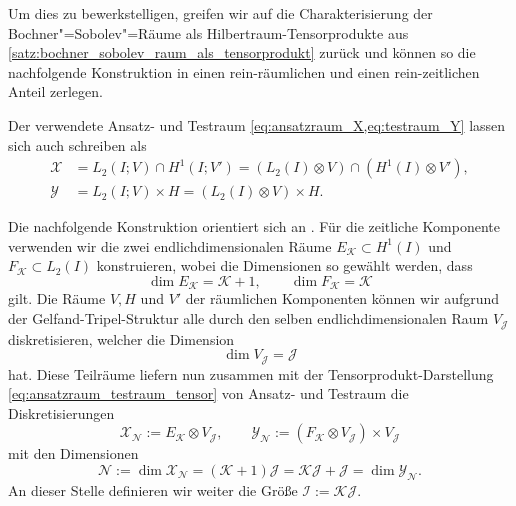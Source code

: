 \documentclass[../main.tex]{subfiles}
\begin{document}
Um dies zu bewerkstelligen, greifen wir auf die Charakterisierung der Bochner"=Sobolev"=Räume als Hilbertraum-Tensorprodukte aus \cref{satz:bochner_sobolev_raum_als_tensorprodukt} zurück und können so die nachfolgende Konstruktion in einen rein-räumlichen und einen rein-zeitlichen Anteil zerlegen.

\begin{Korollar}
    Der verwendete Ansatz- und Testraum \cref{eq:ansatzraum_X,eq:testraum_Y} lassen sich auch schreiben als
    \begin{equation}
        \label{eq:ansatzraum_testraum_tensor}
        \begin{aligned}
        \mathcal X &= L_{2}(I; V) \cap H^{1}(I; V')
            = (L_2(I) \otimes V) \cap (H^{1}(I) \otimes V'),\\
        \mathcal Y &= L_{2}(I; V) \times H = (L_{2}(I) \otimes V) \times H.
        \end{aligned}
    \end{equation}
\end{Korollar}

Die nachfolgende Konstruktion orientiert sich an \cite{Andreev:2012uh}.
Für die zeitliche Komponente verwenden wir die zwei endlichdimensionalen Räume $E_{\mathcal K} \subset H^{1}(I)$ und $F_{\mathcal K} \subset L_{2}(I)$ konstruieren, wobei die Dimensionen so gewählt werden, dass
\begin{equation}
    \label{eq:dimensionen_zeitliche_raeume}
    \dim E_{\mathcal K} = \mathcal K + 1, \qquad \dim F_{\mathcal K} = \mathcal K
\end{equation}
gilt.
Die Räume $V, H$ und $V'$ der räumlichen Komponenten können wir aufgrund der Gelfand-Tripel-Struktur alle durch den selben endlichdimensionalen Raum $V_{\mathcal J}$ diskretisieren, welcher die Dimension
\begin{equation}
    \label{eq:dimension_raeumliche_raeume}
    \dim V_{\mathcal J} = \mathcal J
\end{equation}
hat.
Diese Teilräume liefern nun zusammen mit der Tensorprodukt-Darstellung \cref{eq:ansatzraum_testraum_tensor} von Ansatz- und Testraum die Diskretisierungen
\begin{equation}
\label{eq:diskrete_tensor_raueme}
    \mathcal X_{\mathcal N} := E_{\mathcal K} \otimes V_{\mathcal J}, \qquad \mathcal Y_{\mathcal N} := (F_{\mathcal K} \otimes V_{\mathcal J}) \times V_{\mathcal J}
\end{equation}
mit den Dimensionen
\begin{equation}
    \mathcal N := \dim \mathcal X_{\mathcal N} = (\mathcal K + 1) \mathcal J = \mathcal K \mathcal J + \mathcal J = \dim \mathcal Y_{\mathcal N}.
\end{equation}
An dieser Stelle definieren wir weiter die Größe $\mathcal I := \mathcal K \mathcal J$.
\end{document}
